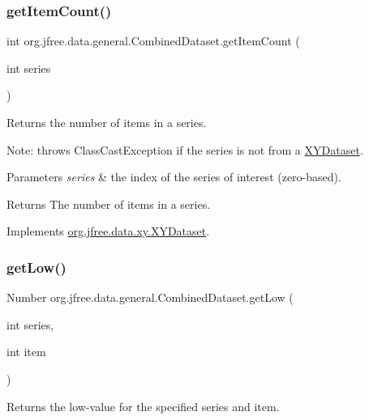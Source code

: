 \subsubsection{\texorpdfstring{get\+Item\+Count()}{getItemCount()}}
{\footnotesize\ttfamily int org.\+jfree.\+data.\+general.\+Combined\+Dataset.\+get\+Item\+Count (\begin{DoxyParamCaption}\item[{int}]{series }\end{DoxyParamCaption})}

Returns the number of items in a series. 

Note\+: throws {\ttfamily Class\+Cast\+Exception} if the series is not from a \mbox{\hyperlink{}{X\+Y\+Dataset}}.


\begin{DoxyParams}{Parameters}
{\em series} & the index of the series of interest (zero-\/based).\\
\hline
\end{DoxyParams}
\begin{DoxyReturn}{Returns}
The number of items in a series. 
\end{DoxyReturn}


Implements \mbox{\hyperlink{interfaceorg_1_1jfree_1_1data_1_1xy_1_1_x_y_dataset_ae81f9de91dfcae45028fc8a486a119da}{org.\+jfree.\+data.\+xy.\+X\+Y\+Dataset}}.

\mbox{\label{classorg_1_1jfree_1_1data_1_1general_1_1_combined_dataset_a2efcaba52f70e4982cc7872fcf447bfb}} 
\subsubsection{\texorpdfstring{get\+Low()}{getLow()}}
{\footnotesize\ttfamily Number org.\+jfree.\+data.\+general.\+Combined\+Dataset.\+get\+Low (\begin{DoxyParamCaption}\item[{int}]{series,  }\item[{int}]{item }\end{DoxyParamCaption})}

Returns the low-\/value for the specified series and item. 


